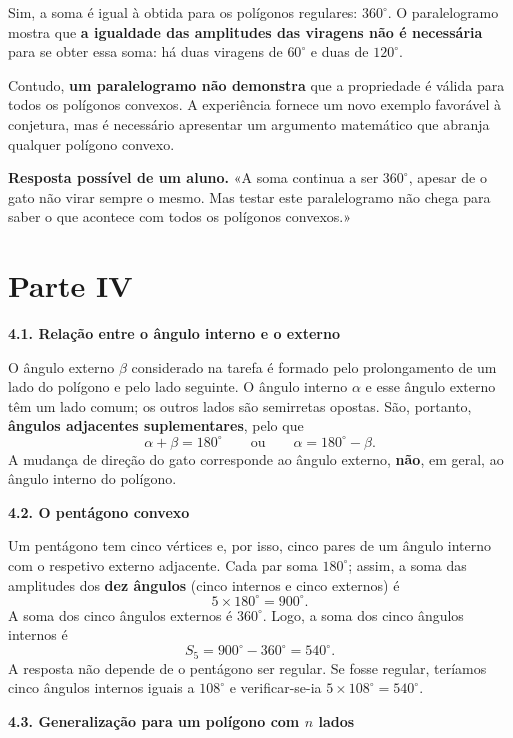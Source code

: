 Sim, a soma é igual à obtida para os polígonos regulares: $360^\circ$.
O paralelogramo mostra que \textbf{a igualdade das amplitudes das
viragens não é necessária} para se obter essa soma: há duas viragens
de $60^\circ$ e duas de $120^\circ$.

Contudo, \textbf{um paralelogramo não demonstra} que a propriedade
é válida para todos os polígonos convexos. A experiência fornece
um novo exemplo favorável à conjetura, mas é necessário apresentar
um argumento matemático que abranja qualquer polígono convexo.

\begin{nota}
\textbf{Resposta possível de um aluno.} «A soma continua a ser
$360^\circ$, apesar de o gato não virar sempre o mesmo. Mas testar
este paralelogramo não chega para saber o que acontece com todos os
polígonos convexos.»
\end{nota}

\section*{Parte IV}

\noindent\textbf{4.1. Relação entre o ângulo interno e o externo}

O ângulo externo $\beta$ considerado na tarefa é formado pelo
prolongamento de um lado do polígono e pelo lado seguinte. O ângulo
interno $\alpha$ e esse ângulo externo têm um lado comum; os
outros lados são semirretas opostas. São, portanto, \textbf{ângulos
adjacentes suplementares}, pelo que
\[
\boxed{\alpha+\beta=180^\circ}
\qquad\text{ou}\qquad
\boxed{\alpha=180^\circ-\beta}.
\]
A mudança de direção do gato corresponde ao ângulo externo,
\textbf{não}, em geral, ao ângulo interno do polígono.

\noindent\textbf{4.2. O pentágono convexo}

Um pentágono tem cinco vértices e, por isso, cinco pares de um
ângulo interno com o respetivo externo adjacente. Cada par soma
$180^\circ$; assim, a soma das amplitudes dos \textbf{dez ângulos}
(cinco internos e cinco externos) é
\[
5\times180^\circ=900^\circ.
\]
A soma dos cinco ângulos externos é $360^\circ$. Logo, a soma dos
cinco ângulos internos é
\[
\boxed{S_5=900^\circ-360^\circ=540^\circ}.
\]
A resposta não depende de o pentágono ser regular. Se fosse regular,
teríamos cinco ângulos internos iguais a $108^\circ$ e verificar-se-ia
$5\times108^\circ=540^\circ$.

\noindent\textbf{4.3. Generalização para um polígono com $n$ lados}

